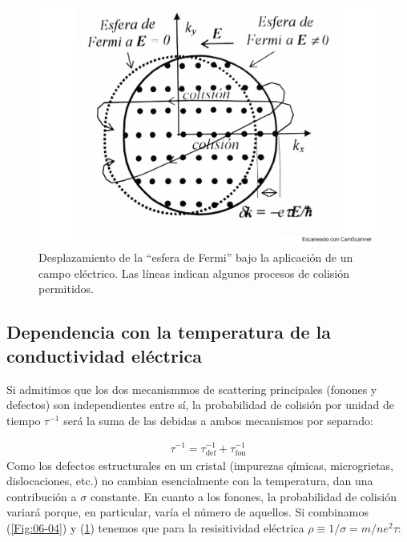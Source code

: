 \begin{figure}[h!] \centering
    \includegraphics[scale=0.35]{Cuerpo/Ch_06/Fotos libro 5.pdf}
    \caption{Desplazamiento de la ``esfera de Fermi'' bajo la aplicación de un campo eléctrico. Las líneas indican algunos procesos de colisión permitidos.}
    \label{Fig:06-05}
\end{figure}  

\subsection{Dependencia con la temperatura de la conductividad eléctrica}

Si admitimos que los dos mecanismmos de scattering principales (fonones y defectos) son independientes entre sí, la probabilidad de colisión por unidad de tiempo $\tau^{-1}$ será la suma de las debidas a ambos mecanismos por separado:

\begin{eqnarray}
	\tau^{-1} = \tau_{\text{def}}^{-1} +\tau_{\text{fon}}^{-1}
    \label{Ec:06-03-04}
\end{eqnarray}
Como los defectos estructurales en un cristal (impurezas qímicas, microgrietas, dislocaciones, etc.) no cambian esencialmente con la temperatura, dan una contribución a $\sigma$ constante. En cuanto a los fonones, la probabilidad de colisión variará porque, en particular, varía el número de aquellos. Si combinamos (\ref{Fig:06-04}) y (\ref{Fig:06-05}) tenemos que para la resisitividad eléctrica $\rho\equiv 1/\sigma=m/ne^2 \tau$:

